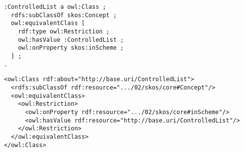 \vspace{-\parskip}
\begin{minipage}[b]{.394\textwidth}
\begin{lstlisting}[language=Turtle, caption={In-scheme equivalent class in Turtle syntax}, captionpos=b]
:ControlledList a owl:Class ;  
  rdfs:subClassOf skos:Concept ;
  owl:equivalentClass [
    rdf:type owl:Restriction ;
    owl:hasValue :ControlledList ;
    owl:onProperty skos:inScheme ;
  ] ;  
.
\end{lstlisting}
\end{minipage}%
\quad\vspace{-\parskip}
\begin{minipage}[b]{.62\textwidth}
\begin{lstlisting}[language=RDF/XML, caption={In-scheme equivalent class in RDF/XML syntax}, captionpos=b]
<owl:Class rdf:about="http://base.uri/ControlledList">
  <rdfs:subClassOf rdf:resource=".../02/skos/core#Concept"/>
  <owl:equivalentClass>
    <owl:Restriction>
      <owl:onProperty rdf:resource=".../02/skos/core#inScheme"/>
      <owl:hasValue rdf:resource="http://base.uri/ControlledList"/>
    </owl:Restriction>
  </owl:equivalentClass>
</owl:Class>
\end{lstlisting}
\end{minipage}
\vspace{-\parskip}